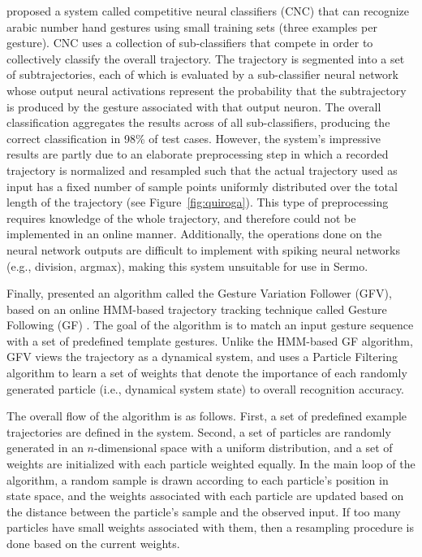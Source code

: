 \citet{quiroga2013}
proposed a system called competitive neural classifiers (CNC)
that can recognize arabic number hand gestures
using small training sets (three examples per gesture).
CNC uses a collection of sub-classifiers
that compete in order to collectively
classify the overall trajectory.
The trajectory is segmented
into a set of subtrajectories,
each of which is evaluated by
a sub-classifier neural network
whose output neural activations
represent the probability that
the subtrajectory is produced by
the gesture associated with that output neuron.
The overall classification aggregates the results
across of all sub-classifiers,
producing the correct classification
in 98\% of test cases.
However, the system's impressive results
are partly due to an elaborate preprocessing step
in which a recorded trajectory
is normalized and resampled
such that the actual trajectory used as input
has a fixed number of sample points
uniformly distributed over
the total length of the trajectory
(see Figure~\ref{fig:quiroga}).
This type of preprocessing
requires knowledge of the whole trajectory,
and therefore could not be implemented
in an online manner.
Additionally, the operations done
on the neural network outputs
are difficult to implement
with spiking neural networks
(e.g., division, argmax),
making this system unsuitable
for use in Sermo.


Finally, \citet{caramiaux2014}
presented an algorithm called the
Gesture Variation Follower (GFV),
based on an online HMM-based
trajectory tracking technique
called Gesture Following (GF)
\citep{bevilacqua2010,bevilacqua2011}.
The goal of the algorithm is to match
an input gesture sequence
with a set of predefined template gestures.
Unlike the HMM-based GF algorithm,
GFV views the trajectory as a dynamical system,
and uses a Particle Filtering algorithm
to learn a set of weights
that denote the importance of
each randomly generated particle
(i.e., dynamical system state)
to overall recognition accuracy.

The overall flow of the algorithm
is as follows.
First, a set of predefined example trajectories
are defined in the system.
Second, a set of particles
are randomly generated
in an $n$-dimensional space
with a uniform distribution,
and a set of weights are initialized
with each particle weighted equally.
In the main loop of the algorithm,
a random sample is drawn
according to each particle's position
in state space,
and the weights associated with each particle
are updated based on the distance
between the particle's sample
and the observed input.
If too many particles have small weights
associated with them,
then a resampling procedure is done
based on the current weights.

